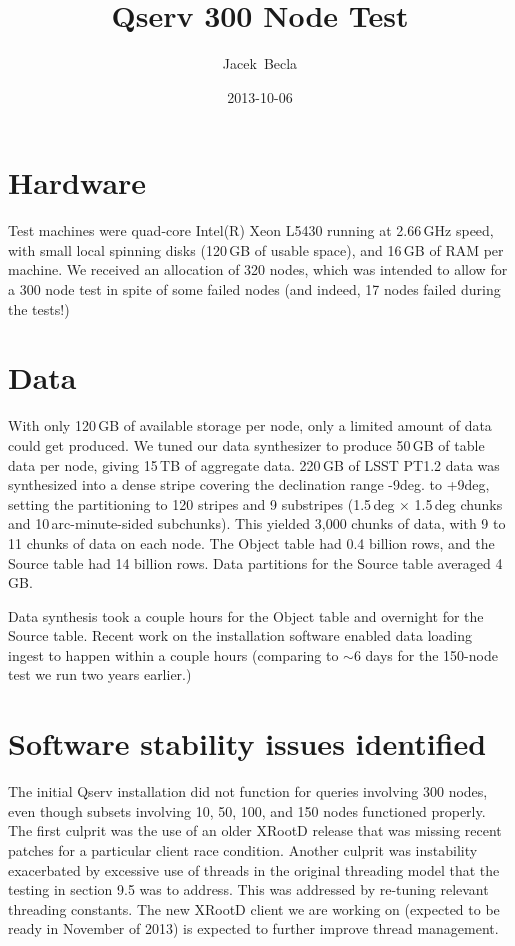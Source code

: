 \documentclass[DM,toc]{lsstdoc}
\title[Qserv Test 2013]{Qserv 300 Node Test}
\author{Jacek~Becla}
\date{2013-10-06}
\begin{document}
\maketitle

\section{Hardware}
Test machines were quad-core Intel(R) Xeon L5430 running at 2.66\,GHz speed, with small local spinning disks (120\,GB of usable space), and 16\,GB of RAM per machine. We received an allocation of 320 nodes, which was intended to allow for a 300 node test in spite of some failed nodes (and indeed, 17 nodes failed during the tests!)

\section{Data}
With only 120\,GB of available storage per node, only a limited amount of data could get produced. We tuned our data synthesizer to produce 50\,GB of table data per node, giving 15\,TB of aggregate data. 220\,GB of LSST PT1.2 data  was synthesized into a dense stripe covering the declination range -9deg. to +9deg, setting the partitioning to 120 stripes and 9 substripes (1.5\,deg $\times$ 1.5\,deg chunks and 10\,arc-minute-sided subchunks). This yielded 3,000 chunks of data, with 9 to 11 chunks of data on each node. The Object table had 0.4 billion rows, and the Source table had 14 billion rows. Data partitions for the Source table averaged 4\,GB.

Data synthesis took a couple hours for the Object table and overnight for the Source table. Recent work on the installation software enabled data loading ingest to happen within a couple hours (comparing to $\sim$6 days for the 150-node test we run two years earlier.)

\section{Software stability issues identified}

The initial Qserv installation did not function for queries involving 300 nodes, even though subsets involving 10, 50, 100, and 150 nodes functioned properly. The first culprit was the use of an older XRootD release that was missing recent patches for a particular client race condition. Another culprit was instability exacerbated by excessive use of threads in the original threading model that the testing in section 9.5 was to address. This was addressed by re-tuning relevant threading constants. The new XRootD client we are working on (expected to be ready in November of 2013) is expected to further improve thread management.
\end{document}
